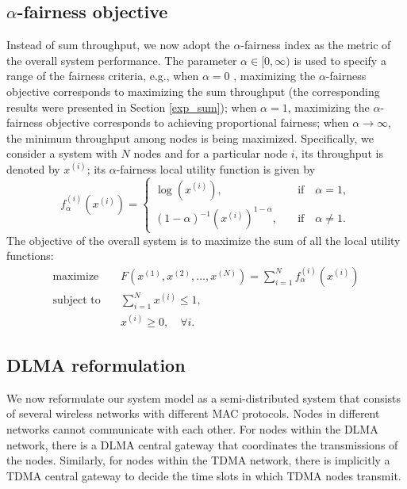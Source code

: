 \documentclass[journal,comsoc]{IEEEtran}
\begin{document}
\subsection{$ \alpha $-fairness objective}
Instead of sum throughput, we now adopt the  $ \alpha $-fairness index as the metric of the overall system performance. The parameter $ \alpha  \in [0,\infty ) $  is used to specify a range of the fairness criteria, e.g., when $ \alpha=0 $ , maximizing the $ \alpha $-fairness objective corresponds to maximizing the sum throughput (the corresponding results were presented in Section \ref{exp_sum}); when $ \alpha=1 $, maximizing the $ \alpha $-fairness objective corresponds to achieving proportional fairness; when  $ \alpha\rightarrow \infty $, the minimum throughput among nodes is being maximized. Specifically, we consider a system with $ N $  nodes and for a particular node  $ i $, its throughput is denoted by  $ x^{\left( i\right) } $; its  $ \alpha $-fairness local utility function is given by
\begin{equation}
f_\alpha ^{\left( i \right)}\left( {{x^{\left( i \right)}}} \right) = \left\{ {\begin{array}{*{20}{c}}
{\log \left( {{x^{\left( i \right)}}} \right)},\quad & \text{if} \quad \alpha = 1,\\
{{{\left( {1 - \alpha } \right)}^{ - 1}}{{\left( {{x^{\left( i \right)}}} \right)}^{1 - \alpha }}},\quad & \text{if} \quad \alpha  \ne 1.
\end{array}} \right.
\end{equation}
The objective of the overall system is to maximize the sum of all the local utility functions:
\begin{align}\label{fair-objective}
\text{maximize} \quad &F\left( {{x^{\left( 1 \right)}},{x^{\left( 2 \right)}}, \ldots ,{x^{\left( N \right)}}} \right) = \sum\limits_{i = 1}^N {f_\alpha ^{\left( i \right)}\left( {{x^{\left( i \right)}}} \right)} \nonumber \\
\text{subject to} \quad 
&\sum\nolimits_{i = 1}^N {{x^{\left( i \right)}}}  \le 1, \\
&{x^{\left( i \right)}} \ge 0,\quad \forall i. \nonumber
\end{align}
\subsection{DLMA reformulation}
We now reformulate our system model as a semi-distributed system that consists of several wireless networks with different MAC protocols.  Nodes in different networks cannot communicate with each other. For nodes within the DLMA network, there is a DLMA central gateway that coordinates the transmissions of the nodes. Similarly, for nodes within the TDMA network, there is implicitly a TDMA central gateway to decide the time slots in which TDMA nodes transmit. 
\end{document}
